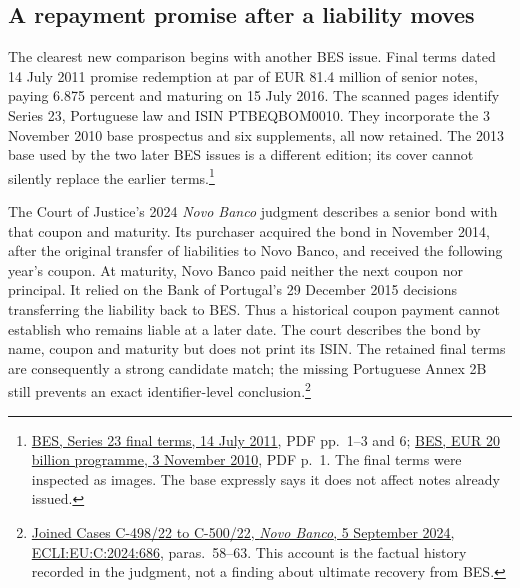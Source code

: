 \subsection{A repayment promise after a liability moves}

The clearest new comparison begins with another BES issue. Final terms dated
14 July 2011 promise redemption at par of EUR 81.4 million of senior notes,
paying 6.875 percent and maturing on 15 July 2016. The scanned pages identify
Series 23, Portuguese law and ISIN PTBEQBOM0010. They incorporate the
3 November 2010 base prospectus and six supplements, all now retained.
The 2013 base used by the two later BES issues is a different edition;
its cover cannot silently replace the earlier terms.\footnote{
\href{../prospectus/corner-cases-2026-10-04/sources/jur-more-bes-1315263/source.pdf}
{BES, Series 23 final terms, 14 July 2011}, PDF pp.~1--3 and 6;
\href{../prospectus/corner-cases-2026-10-04/sources/jur-more-bes-1217215/source.pdf}
{BES, EUR 20 billion programme, 3 November 2010}, PDF p.~1.
The final terms were inspected as images. The base expressly says it does
not affect notes already issued.}

The Court of Justice's 2024 \emph{Novo Banco} judgment describes a senior
bond with that coupon and maturity. Its purchaser acquired the bond in
November 2014, after the original transfer of liabilities to Novo Banco,
and received the following year's coupon. At maturity, Novo Banco paid
neither the next coupon nor principal. It relied on the Bank of Portugal's
29 December 2015 decisions transferring the liability back to BES.
Thus a historical coupon payment cannot establish who remains liable at a
later date. The court describes the bond by name, coupon and maturity but
does not print its ISIN. The retained final terms are consequently a strong
candidate match; the missing Portuguese Annex 2B still prevents an exact
identifier-level conclusion.\footnote{
\href{../prospectus/corner-cases-2026-10-04/sources/jur-more-c498-judgment/source.html}
{Joined Cases C-498/22 to C-500/22, \emph{Novo Banco}, 5 September 2024,
ECLI:EU:C:2024:686}, paras.~58--63. This account is the factual history
recorded in the judgment, not a finding about ultimate recovery from BES.}

